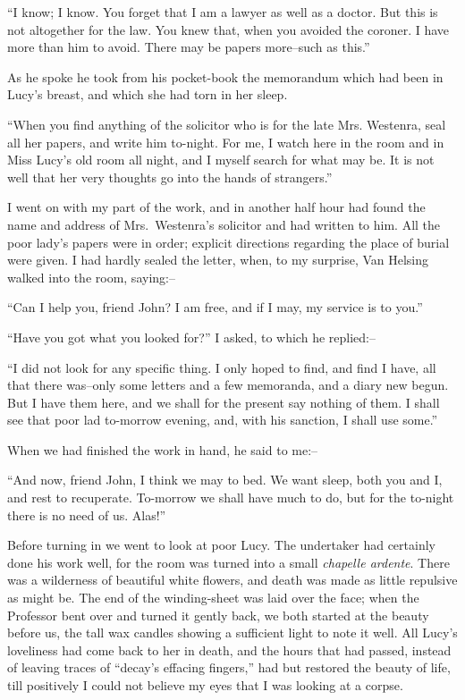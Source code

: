 \documentclass[12pt,openright]{book}
\begin{document}
“I know; I know. You forget that I am a lawyer as well as a doctor. But this is not altogether for the law. You knew that, when you avoided the coroner. I have more than him to avoid. There may be papers more–such as this.”

As he spoke he took from his pocket-book the memorandum which had been in Lucy’s breast, and which she had torn in her sleep.

“When you find anything of the solicitor who is for the late Mrs. Westenra, seal all her papers, and write him to-night. For me, I watch here in the room and in Miss Lucy’s old room all night, and I myself search for what may be. It is not well that her very thoughts go into the hands of strangers.”

I went on with my part of the work, and in another half hour had found the name and address of Mrs. Westenra’s solicitor and had written to him. All the poor lady’s papers were in order; explicit directions regarding the place of burial were given. I had hardly sealed the letter, when, to my surprise, Van Helsing walked into the room, saying:–

“Can I help you, friend John? I am free, and if I may, my service is to you.”

“Have you got what you looked for?” I asked, to which he replied:–

“I did not look for any specific thing. I only hoped to find, and find I have, all that there was–only some letters and a few memoranda, and a diary new begun. But I have them here, and we shall for the present say nothing of them. I shall see that poor lad to-morrow evening, and, with his sanction, I shall use some.”

When we had finished the work in hand, he said to me:–

“And now, friend John, I think we may to bed. We want sleep, both you and I, and rest to recuperate. To-morrow we shall have much to do, but for the to-night there is no need of us. Alas!”

Before turning in we went to look at poor Lucy. The undertaker had certainly done his work well, for the room was turned into a small \textit{chapelle ardente}. There was a wilderness of beautiful white flowers, and death was made as little repulsive as might be. The end of the winding-sheet was laid over the face; when the Professor bent over and turned it gently back, we both started at the beauty before us, the tall wax candles showing a sufficient light to note it well. All Lucy’s loveliness had come back to her in death, and the hours that had passed, instead of leaving traces of “decay’s effacing fingers,” had but restored the beauty of life, till positively I could not believe my eyes that I was looking at a corpse.
\end{document}
